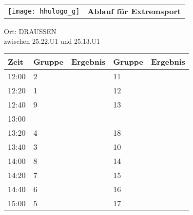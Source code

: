 \documentclass[a4paper,10pt]{article}
\def\spielb{Extremsport}
\def\raumb{DRAUSSEN}
\begin{document}
  \begin{tabularx}{\textwidth}{lc}
    \texttt{[image: hhulogo\_g]}
  & {\Huge \textbf{Ablauf für \spielb}}
  \end{tabularx}
  \LARGE
  \begin{center}
    \vspace{1cm} 
    Ort: \raumb \\ zwischen 25.22.U1 und 25.13.U1
  \end{center}
    \vspace{2cm} 
    \begin{tabularx}{\textwidth}{X||X|X||X|X}
	\textbf{Zeit} &\textbf{Gruppe} & \textbf{Ergebnis} &\textbf{Gruppe} & \textbf{Ergebnis}  	\\ \hline \hline
	12:00 &	2	&	&11	&	\\ \hline
	12:20 &1	&	&12	&	\\ \hline
	12:40 &	9	&	&13	&	\\ \hline

	13:00 &		&	&	&	\\ \hline
	13:20 &	4	&	&18	&	\\ \hline
	13:40 &	3	&	&10	&	\\ \hline

	14:00 &	8	&	&14	&	\\ \hline
	14:20 &	7	&	&15	&	\\ \hline
	14:40 &	6	&	&16	&	\\ \hline

	15:00 &	5	&	&17	&	\\ \hline
      
    \end{tabularx}
   
   \newpage
\end{document}
